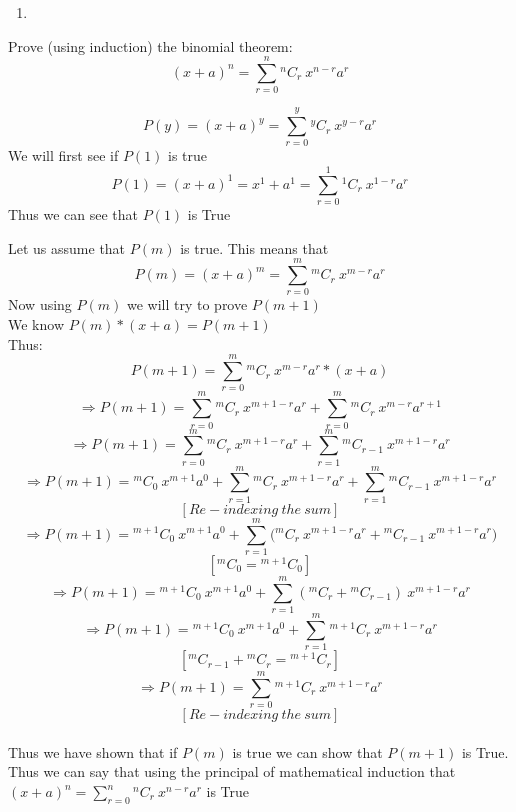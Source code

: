 \documentclass[10pt]{article}
\newenvironment{solution}[2][Solution]{ \begin{trivlist}
\item[\hskip \labelsep {\bfseries #1}]}{\end{trivlist}}
\newenvironment{problem}[2][Problem]{\begin{trivlist}
\item[\hskip \labelsep {\bfseries #1}\hskip \labelsep {\bfseries #2.}]}{\end{trivlist}}
\begin{document}
\begin{solution}{1}
\item[]
\begin{enumerate}
    \parskip=0in
    \parsep=0in
    \itemsep=0.1in
\item
\end{enumerate}
\end{solution}



\vskip 0.5in
\newpage
\begin{problem}{2}
Prove (using induction) the binomial theorem:
\[
(x+a)^n = \sum_{r=0}^n{^{n}C_{r}}\ x^{n-r}a^r
\]
\end{problem}
\begin{solution}{2}
\item[] 
\[
P(y) = (x+a)^y = \sum_{r=0}^y{^{y}C_{r}}\ x^{y-r}a^r\]
We will first see if $P(1)$ is true
\[
P(1) = (x+a)^1 = x^1 + a^1 = \sum_{r=0}^1{^{1}C_{r}}\ x^{1-r}a^r
\]
Thus we can see that $P(1)$ is True

Let us assume that $P(m)$ is true. This means that 
\[P(m)  = (x+a)^m = \sum_{r=0}^m{^{m}C_{r}}\ x^{m-r}a^r
\]
Now using $P(m)$ we will try to prove $P(m+1)$\\
We know $P(m) * (x+a) = P(m+1)$\\
Thus: \[P(m+1) = {\sum_{r=0}^m{^{m}C_{r}}\ x^{m-r}a^r } * (x+a) \]
\[\Rightarrow P(m+1) = {\sum_{r=0}^m{^{m}C_{r}}\ x^{m+1-r}a^r } + {\sum_{r=0}^m{^{m}C_{r}}\ x^{m-r}a^{r+1} } \]
\[\Rightarrow P(m+1) = {\sum_{r=0}^m{^{m}C_{r}}\ x^{m+1-r}a^r } + {\sum_{r=1}^m{^{m}C_{r-1}}\ x^{m+1-r}a^{r} } \]
\[\Rightarrow P(m+1) = {{^{m}C_{0}}\ x^{m+1}a^0}+  {\sum_{r=1}^m{^{m}C_{r}}\ x^{m+1-r}a^r } + {\sum_{r=1}^m{^{m}C_{r-1}}\ x^{m+1-r}a^{r} }\] 
$$[Re-indexing\ the\ sum]$$
\[\Rightarrow P(m+1) = {{^{m+1}C_{0}}\ x^{m+1}a^0}+  {\sum_{r=1}^m({^{m}C_{r}}\ x^{m+1-r}a^r + {^{m}C_{r-1}}\ x^{m+1-r}a^{r}}) \]
$$[{^{m}C_{0}} = {^{m+1}C_{0}}]$$
\[\Rightarrow P(m+1) = {{^{m+1}C_{0}}\ x^{m+1}a^0}+  {\sum_{r=1}^m({^{m}C_{r}}+ {^{m}C_{r-1}})\ x^{m+1-r}a^r} \]
\[\Rightarrow P(m+1) = {{^{m+1}C_{0}}\ x^{m+1}a^0}+  {\sum_{r=1}^m{^{m+1}C_{r}}\ x^{m+1-r}a^r} \]
$$[{^{m}C_{r-1}} + {^{m}C_{r}} = {^{m+1}C_{r}}]$$
\[\Rightarrow P(m+1) = {\sum_{r=0}^m{^{m+1}C_{r}}\ x^{m+1-r}a^r} \]
$$[Re-indexing\ the\ sum]$$\\

Thus we have shown that if $P(m)$ is true we can show that $P(m+1)$ is True. \\

Thus we can say that using the principal of mathematical induction that $
(x+a)^n = \sum_{r=0}^n{^{n}C_{r}}\ x^{n-r}a^r
$ is True


\end{solution}
\end{document}
